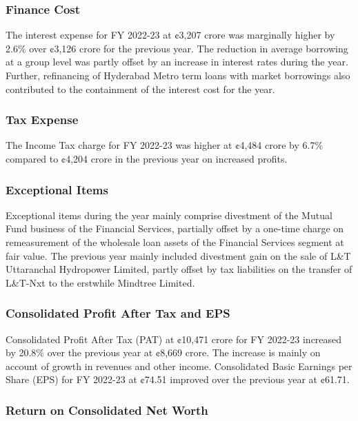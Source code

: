 \subsubsection{Finance Cost}

The interest expense for FY 2022-23 at ¢3,207 crore was marginally higher by 2.6\% over ¢3,126 crore for the previous year. The reduction in average borrowing at a group level was partly offset by an increase in interest rates during the year. Further, refinancing of Hyderabad Metro term loans with market borrowings also contributed to the containment of the interest cost for the year.

\subsubsection{Tax Expense}

The Income Tax charge for FY 2022-23 was higher at ¢4,484 crore by 6.7\% compared to ¢4,204 crore in the previous year on increased profits.

\subsubsection{Exceptional Items}

Exceptional items during the year mainly comprise divestment of the Mutual Fund business of the Financial Services, partially offset by a one-time charge on remeasurement of the wholesale loan assets of the Financial Services segment at fair value. The previous year mainly included divestment gain on the sale of L\&T Uttaranchal Hydropower Limited, partly offset by tax liabilities on the transfer of L\&T-Nxt to the erstwhile Mindtree Limited.

\subsubsection{Consolidated Profit After Tax and EPS}

Consolidated Profit After Tax (PAT) at ¢10,471 crore for FY 2022-23 increased by 20.8\% over the previous year at ¢8,669 crore. The increase is mainly on account of growth in revenues and other income. Consolidated Basic Earnings per Share (EPS) for FY 2022-23 at ¢74.51 improved over the previous year at ¢61.71.

\subsubsection{Return on Consolidated Net Worth}

